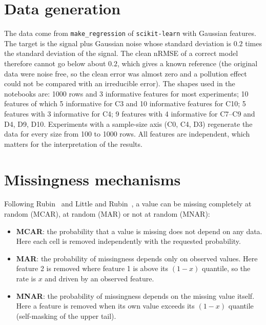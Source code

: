 \documentclass{Configuration_Files/PoliMi3i_thesis}
\begin{document}
\section{Data generation}
\label{sec:data}%
The data come from \texttt{make\_regression} of \texttt{scikit-learn} with Gaussian features. The target is the signal plus Gaussian noise whose standard deviation is $0.2$ times the standard deviation of the signal. The clean nRMSE of a correct model therefore cannot go below about $0.2$, which gives a known reference (the original data were noise free, so the clean error was almost zero and a pollution effect could not be compared with an irreducible error). The shapes used in the notebooks are: 1000 rows and 3 informative features for most experiments; 10 features of which 5 informative for C3 and 10 informative features for C10; 5 features with 3 informative for C4; 9 features with 4 informative for C7--C9 and D4, D9, D10. Experiments with a sample-size axis (C0, C4, D3) regenerate the data for every size from 100 to 1000 rows. All features are independent, which matters for the interpretation of the results.

\section{Missingness mechanisms}
\label{sec:mechanisms}%
Following Rubin~\cite{rubin1976} and Little and Rubin~\cite{littlerubin2019}, a value can be missing completely at random (MCAR), at random (MAR) or not at random (MNAR):
\begin{itemize}
    \item \textbf{MCAR}: the probability that a value is missing does not depend on any data. Here each cell is removed independently with the requested probability.
    \item \textbf{MAR}: the probability of missingness depends only on observed values. Here feature 2 is removed where feature 1 is above its $(1-x)$ quantile, so the rate is $x$ and driven by an observed feature.
    \item \textbf{MNAR}: the probability of missingness depends on the missing value itself. Here a feature is removed when its own value exceeds its $(1-x)$ quantile (self-masking of the upper tail).
\end{itemize}
\end{document}
